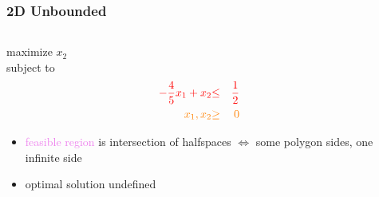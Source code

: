 \documentclass[10pt,aspectratio=169]{beamer}
\begin{document}
\begin{frame} \frametitle{2D Unbounded}
  \begin{columns}
    \begin{column}{0.4 \textwidth}
  maximize $x_2$ \\
  subject to
  \begin{eqnarray*}
    \textcolor{red}{-\frac{4}{5} x_1 + x_2} &\textcolor{red}{\leq}& \textcolor{red}{\frac{1}{2}} \\
    \textcolor{orange}{x_1, x_2} &\textcolor{orange}{\geq}& \textcolor{orange}{0}
  \end{eqnarray*}
  \begin{itemize}
    \item \textcolor{violet}{feasible region} is intersection of halfspaces
     $\Leftrightarrow$ some polygon sides, one infinite side
    \item optimal solution undefined
  \end{itemize}
  \end{column}
  \begin{column}{0.6 \textwidth}
    \begin{center}
  \end{center}
\end{column}
\end{columns}
\end{frame}
\end{document}
